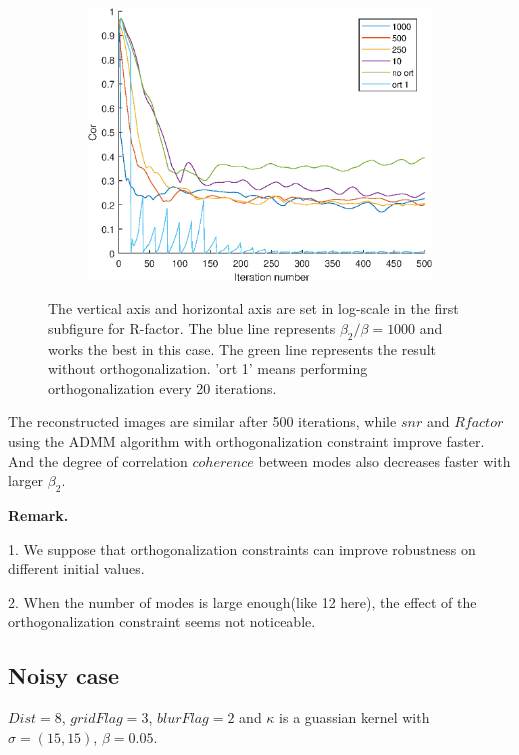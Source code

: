 \documentclass{article}
\numberwithin{equation}{section}
\begin{document}
\begin{figure}
\begin{subfigure}{.3\textwidth}
   \label{fig:ort_snr}
 \end{subfigure}
 \begin{subfigure}{.3\textwidth}
    \centering
    \includegraphics[width=1\linewidth]{figures/ort_cor.eps}  
    \label{fig:ort_cor}
  \end{subfigure}
 \caption{The vertical axis and horizontal axis are set in log-scale in the first subfigure for R-factor. The blue line represents $\beta_2/\beta=1000$ and works the best in this case. The green line represents the result without orthogonalization. 'ort 1' means performing orthogonalization every 20 iterations. }
 \label{fig:ort}
 \end{figure}

 The reconstructed images are similar after 500 iterations, while $snr$ and $R factor$ using the ADMM algorithm with orthogonalization constraint improve faster. And the degree of correlation  $coherence$ between modes also decreases faster with larger $\beta_2$. 



\noindent\textbf{Remark.}

1. We suppose that orthogonalization constraints can improve robustness on different initial values. 

2. When the number of modes is large enough(like 12 here), the effect of the orthogonalization constraint seems not noticeable.

\subsection{Noisy case}
 $Dist=8$, $gridFlag=3$, $blurFlag=2$ and $\kappa$ is a guassian kernel with $\sigma = (15,15)$, $\beta=0.05$.
 
\end{document}
